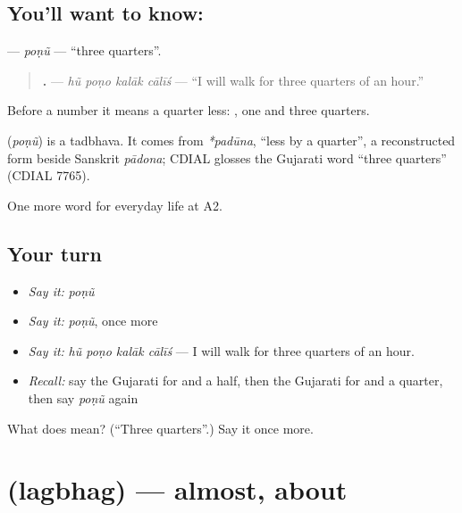 \subsection*{You'll want to know: }
\textbf{} — \emph{poṇũ} — \textquotedblleft{}three quarters\textquotedblright{}.

\begin{quote}
\textbf{   .} — \emph{hũ poṇo kalāk cālīś} — \textquotedblleft{}I will walk for three quarters of an hour.\textquotedblright{}
\end{quote}

Before a number it means a quarter less: \textbf{ }, one and three quarters.

\begin{cousinweb}
\textbf{} (\emph{poṇũ}) is a tadbhava. It comes from \emph{*padūna}, \textquotedblleft{}less by a quarter\textquotedblright{}, a reconstructed form beside Sanskrit \emph{pādona}; CDIAL glosses the Gujarati word \textquotedblleft{}three quarters\textquotedblright{} (CDIAL 7765).
\end{cousinweb}

\begin{grammarlens}[title={What you've built}]
One more word for everyday life at A2.
\end{grammarlens}

\subsection*{Your turn}
\begin{itemize}
\raggedright
  \item \emph{Say it:} \emph{poṇũ}
  \item \emph{Say it:} \emph{poṇũ}, once more
  \item \emph{Say it:} \emph{hũ poṇo kalāk cālīś} — I will walk for three quarters of an hour.
  \item \emph{Recall:} say the Gujarati for and a half, then the Gujarati for and a quarter, then say \emph{poṇũ} again
\end{itemize}

\begin{tcolorbox}[breakable,colback=teal!4,colframe=teal!35!black,title={Before you move on}]
What does  mean? (\textquotedblleft{}Three quarters\textquotedblright{}.) Say it once more.
\end{tcolorbox}
\section[\texorpdfstring{\gu{લગભગ} (lagbhag)}{લગભગ (lagbhag)}]{ (lagbhag) — almost, about}

